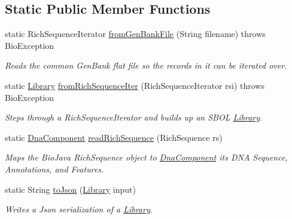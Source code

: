 \subsection*{Static Public Member Functions}
\begin{DoxyCompactItemize}
\item 
static RichSequenceIterator \hyperlink{classorg_1_1sbolstandard_1_1lib_s_b_o_lj_1_1_i_o_tools_ab30e7fc9ccb218e864e45cad4366304a}{fromGenBankFile} (String filename)  throws BioException 
\begin{DoxyCompactList}\small\item\em Reads the common GenBank flat file so the records in it can be iterated over. \item\end{DoxyCompactList}\item 
static \hyperlink{classorg_1_1sbolstandard_1_1lib_s_b_o_lj_1_1_library}{Library} \hyperlink{classorg_1_1sbolstandard_1_1lib_s_b_o_lj_1_1_i_o_tools_a375e674a9edc77307e250df41d76f02d}{fromRichSequenceIter} (RichSequenceIterator rsi)  throws BioException 
\begin{DoxyCompactList}\small\item\em Steps through a RichSequenceIterator and builds up an SBOL \hyperlink{classorg_1_1sbolstandard_1_1lib_s_b_o_lj_1_1_library}{Library}. \item\end{DoxyCompactList}\item 
static \hyperlink{classorg_1_1sbolstandard_1_1lib_s_b_o_lj_1_1_dna_component}{DnaComponent} \hyperlink{classorg_1_1sbolstandard_1_1lib_s_b_o_lj_1_1_i_o_tools_a36d32367508f84b9628401ab634219b2}{readRichSequence} (RichSequence rs)
\begin{DoxyCompactList}\small\item\em Maps the BioJava RichSequence object to \hyperlink{classorg_1_1sbolstandard_1_1lib_s_b_o_lj_1_1_dna_component}{DnaComponent} its DNA Sequence, Annotations, and Features. \item\end{DoxyCompactList}\item 
static String \hyperlink{classorg_1_1sbolstandard_1_1lib_s_b_o_lj_1_1_i_o_tools_a4fd6d767f8ac9cc03cc70a9aff85161b}{toJson} (\hyperlink{classorg_1_1sbolstandard_1_1lib_s_b_o_lj_1_1_library}{Library} input)
\begin{DoxyCompactList}\small\item\em Writes a Json serialization of a \hyperlink{classorg_1_1sbolstandard_1_1lib_s_b_o_lj_1_1_library}{Library}. \item\end{DoxyCompactList}\item 

\end{DoxyCompactItemize}
